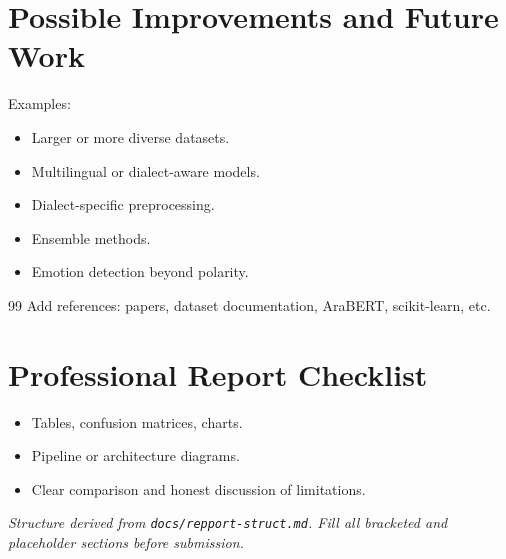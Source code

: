 \documentclass[11pt,a4paper]{report}
\begin{document}
\chapter{Possible Improvements and Future Work}
Examples:
\begin{itemize}[noitemsep]
    \item Larger or more diverse datasets.
    \item Multilingual or dialect-aware models.
    \item Dialect-specific preprocessing.
    \item Ensemble methods.
    \item Emotion detection beyond polarity.
\end{itemize}

\begin{thebibliography}{99}
Add references: papers, dataset documentation, AraBERT, scikit-learn, etc.
\end{thebibliography}

\appendix
\chapter{Professional Report Checklist}
\begin{itemize}[noitemsep]
    \item Tables, confusion matrices, charts.
    \item Pipeline or architecture diagrams.
    \item Clear comparison and honest discussion of limitations.
\end{itemize}

\vspace{1em}
\noindent\textit{Structure derived from \texttt{docs/repport-struct.md}. Fill all bracketed and placeholder sections before submission.}
\end{document}
